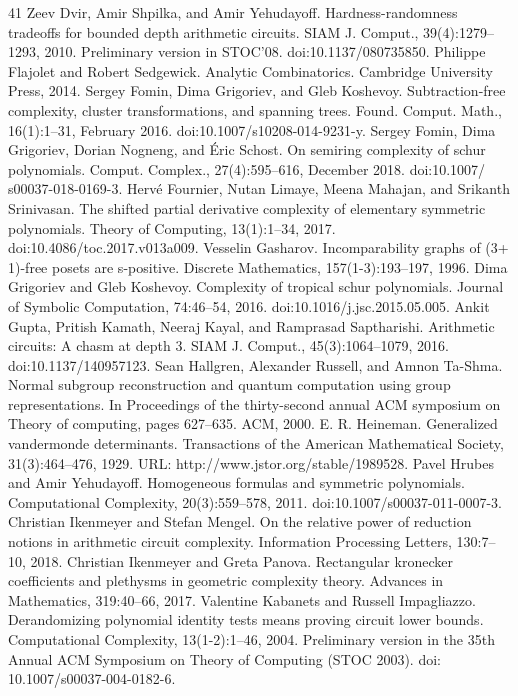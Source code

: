 \documentclass[10pt,a4paper]{article}
\theoremstyle{definition}
\begin{document}
\begin{thebibliography}{41}
 Zeev Dvir, Amir Shpilka, and Amir Yehudayoff. Hardness-randomness tradeoffs for bounded depth arithmetic circuits. SIAM J. Comput., 39(4):1279–1293, 2010. Preliminary version in STOC’08. doi:10.1137/080735850.
 Philippe Flajolet and Robert Sedgewick. Analytic Combinatorics. Cambridge University Press, 2014.
 Sergey Fomin, Dima Grigoriev, and Gleb Koshevoy. Subtraction-free complexity, cluster transformations, and spanning trees. Found. Comput. Math., 16(1):1–31, February 2016. doi:10.1007/s10208-014-9231-y.
 Sergey Fomin, Dima Grigoriev, Dorian Nogneng, and Éric Schost. On semiring complexity of schur polynomials. Comput. Complex., 27(4):595–616, December 2018. doi:10.1007/ s00037-018-0169-3.
 Hervé Fournier, Nutan Limaye, Meena Mahajan, and Srikanth Srinivasan. The shifted partial derivative complexity of elementary symmetric polynomials. Theory of Computing, 13(1):1–34, 2017. doi:10.4086/toc.2017.v013a009.
 Vesselin Gasharov. Incomparability graphs of (3+ 1)-free posets are s-positive. Discrete Mathematics, 157(1-3):193–197, 1996.
 Dima Grigoriev and Gleb Koshevoy. Complexity of tropical schur polynomials. Journal of Symbolic Computation, 74:46–54, 2016. doi:10.1016/j.jsc.2015.05.005.
 Ankit Gupta, Pritish Kamath, Neeraj Kayal, and Ramprasad Saptharishi. Arithmetic circuits: A chasm at depth 3. SIAM J. Comput., 45(3):1064–1079, 2016. doi:10.1137/140957123.
 Sean Hallgren, Alexander Russell, and Amnon Ta-Shma. Normal subgroup reconstruction and quantum computation using group representations. In Proceedings of the thirty-second annual ACM symposium on Theory of computing, pages 627–635. ACM, 2000.
 E. R. Heineman. Generalized vandermonde determinants. Transactions of the American Mathematical Society, 31(3):464–476, 1929. URL: http://www.jstor.org/stable/1989528.
 Pavel Hrubes and Amir Yehudayoff. Homogeneous formulas and symmetric polynomials. Computational Complexity, 20(3):559–578, 2011. doi:10.1007/s00037-011-0007-3.
 Christian Ikenmeyer and Stefan Mengel. On the relative power of reduction notions in arithmetic circuit complexity. Information Processing Letters, 130:7–10, 2018.
 Christian Ikenmeyer and Greta Panova. Rectangular kronecker coefficients and plethysms in geometric complexity theory. Advances in Mathematics, 319:40–66, 2017.
 Valentine Kabanets and Russell Impagliazzo. Derandomizing polynomial identity tests means proving circuit lower bounds. Computational Complexity, 13(1-2):1–46, 2004. Preliminary version in the 35th Annual ACM Symposium on Theory of Computing (STOC 2003). doi: 10.1007/s00037-004-0182-6.

\end{thebibliography}
\end{document}
